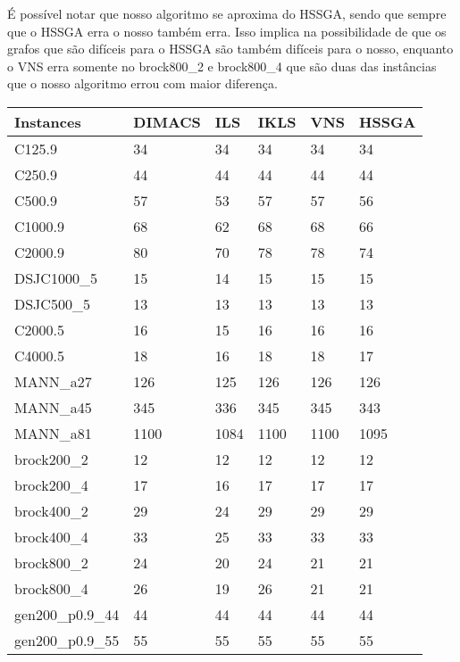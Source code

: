 \documentclass{article}
\begin{document}
É possível notar que nosso algoritmo se aproxima do HSSGA, sendo que sempre que o HSSGA erra o nosso também erra. Isso implica na possibilidade de que os grafos que são difíceis para o HSSGA são também difíceis para o nosso, enquanto o VNS erra somente  no brock800\_2 e brock800\_4 que são duas das instâncias que o nosso algoritmo errou com maior diferença. 

\begin{center}
\begin{table}
\begin{tabular}{| l | l | l | l | l | l |}
    \hline
    Instances			& 	DIMACS		& ILS		& IKLS\cite{kopt}	&VNS\cite{vns}	& HSSGA\cite{HSSGA}\\ \hline
C125.9				&	34			&34			&34				&34				&34\\ \hline
C250.9				&	44			&44			&44				&44				&44\\ \hline
C500.9				&	57			&53			&57				&57				&56\\ \hline
C1000.9				&	68			&62			&68				&68				&66\\ \hline
C2000.9 			&	80			&70			&78				&78				&74\\ \hline	
DSJC1000\_5		&	15			&14			&15				&15				&15\\ \hline
DSJC500\_5			&	13			&13			&13				&13				&13\\ \hline
C2000.5				&	16			&15			&16				&16				&16\\ \hline
C4000.5 			&	18			&16			&18				&18				&17\\ \hline
MANN\_a27			&	126			&125		&126			&126			&126\\ \hline
MANN\_a45			&	345			&336		&345			&345			&343\\ \hline
MANN\_a81			&	1100		&1084		&1100			&1100			&1095\\ \hline
brock200\_2			&	12			&12			&12				&12				&12\\ \hline
brock200\_4			&	17			&16			&17				&17				&17\\ \hline
brock400\_2			&	29			&24			&29				&29				&29\\ \hline
brock400\_4			&	33			&25			&33				&33				&33\\ \hline
brock800\_2			&	24			&20			&24				&21				&21\\ \hline
brock800\_4			&	26			&19			&26				&21				&21\\ \hline
gen200\_p0.9\_44	&	44			&44			&44				&44				&44\\ \hline
gen200\_p0.9\_55	&	55			&55			&55				&55				&55\\ \hline

\end{tabular}
\end{table}
\end{center}
\end{document}
